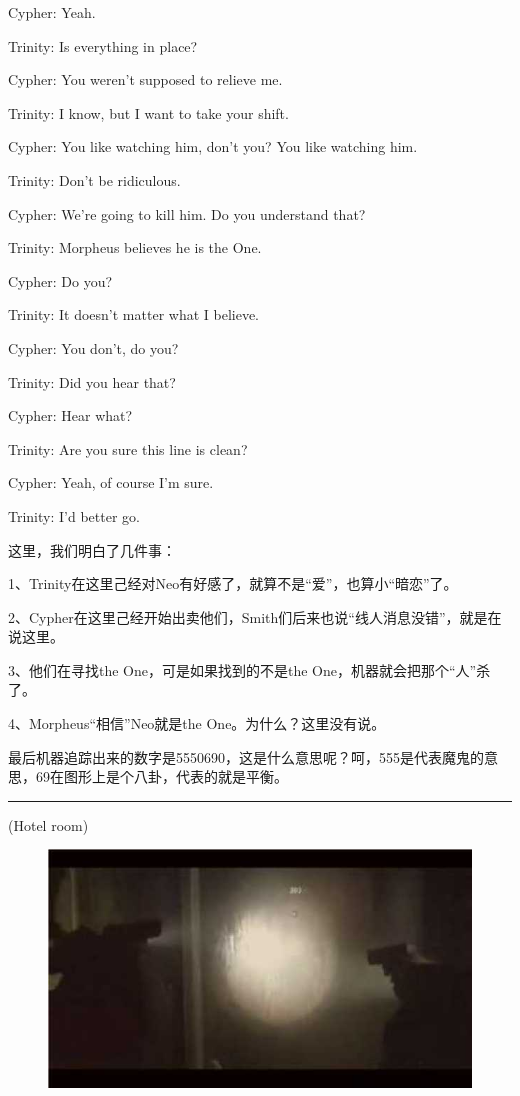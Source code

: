 \documentclass{ctexart}
\newcommand{\myparsep}{\noindent \rule[0.5ex]{\linewidth}{1pt}}
\newenvironment{myquote}{\color{green} \setlength{\leftskip}{6em} \setlength{\rightskip}{4em} \setlength{\parindent}{-2em}}{\par}
\begin{document}
\begin{myquote}
Cypher: Yeah.

Trinity: Is everything in place?

Cypher: You weren't supposed to relieve me.

Trinity: I know, but I want to take your shift.

Cypher: You like watching him, don't you? You like watching him.

Trinity: Don't be ridiculous.

Cypher: We're going to kill him. Do you understand that?

Trinity: Morpheus believes he is the One.

Cypher: Do you?

Trinity: It doesn't matter what I believe.

Cypher: You don't, do you?

Trinity: Did you hear that?

Cypher: Hear what?

Trinity: Are you sure this line is clean?

Cypher: Yeah, of course I'm sure.

Trinity: I'd better go.
\end{myquote}

这里，我们明白了几件事：

1、Trinity在这里己经对Neo有好感了，就算不是“爱”，也算小“暗恋”了。

2、Cypher在这里己经开始出卖他们，Smith们后来也说“线人消息没错”，就是在说这里。

3、他们在寻找the One，可是如果找到的不是the One，机器就会把那个“人”杀了。

4、Morpheus“相信”Neo就是the One。为什么？这里没有说。

最后机器追踪出来的数字是5550690，这是什么意思呢？呵，555是代表魔鬼的意思，69在图形上是个八卦，代表的就是平衡。

\myparsep

\begin{myquote}
(Hotel room)
\end{myquote}

\begin{figure}[htb]
\centering
\includegraphics[width=0.5\linewidth]{fig/read_Matrix-1}
\end{figure}
\end{document}
